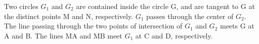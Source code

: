 \item Two circles $G_1$ and $G_2$ are contained inside the circle G, and are tangent to G at the distinct points M and N, respectively. $G_1$ passes through the center of $G_2$. The line passing through the two points of intersection of $G_1$ and $G_2$ meets G at A and B. The lines MA and MB meet $G_1$ at C and D, respectively.

